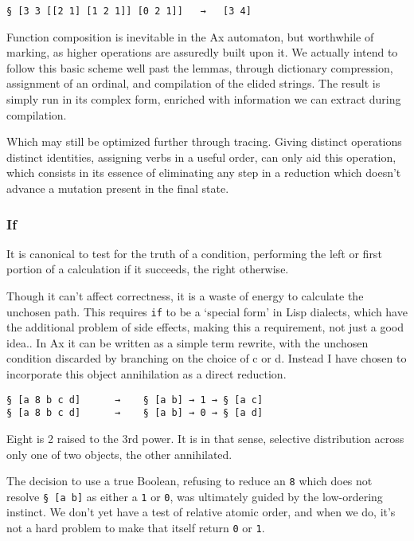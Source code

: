 \documentclass[twoside]{article}
\begin{document}
\begin{lstlisting}[style=listingblock]
§ [3 3 [[2 1] [1 2 1]] [0 2 1]]   →   [3 4]
\end{lstlisting}


Function composition is inevitable in the Ax automaton, but worthwhile of marking, as higher operations are assuredly built upon it. We actually intend to follow this basic scheme well past the lemmas, through dictionary compression, assignment of an ordinal, and compilation of the elided strings. The result is simply run in its complex form, enriched with information we can extract during compilation.

Which may still be optimized further through tracing. Giving distinct operations distinct identities, assigning verbs in a useful order, can only aid this operation, which consists in its essence of eliminating any step in a reduction which doesn't advance a mutation present in the final state.

\subsubsection{If}

It is canonical to test for the truth of a condition, performing the left or first portion of a calculation if it succeeds, the right otherwise.

Though it can't affect correctness, it is a waste of energy to calculate the unchosen path. This requires \texttt{if} to be a `special form' in Lisp dialects, which have the additional problem of side effects, making this a requirement, not just a good idea.. In Ax it can be written as a simple term rewrite, with the unchosen condition discarded by branching on the choice of c or d.  Instead I have chosen to incorporate this object annihilation as a direct reduction.

\begin{lstlisting}[style=listingcode]
§ [a 8 b c d]      →    § [a b] → 1 → § [a c]
§ [a 8 b c d]      →    § [a b] → 0 → § [a d]
\end{lstlisting}

Eight is 2 raised to the 3rd power. It is in that sense, selective distribution across only one of two objects, the other annihilated.

The decision to use a true Boolean, refusing to reduce an \texttt{8} which does not resolve \texttt{§ [a b]} as either a \texttt{1} or \texttt{0}, was ultimately guided by the low-ordering instinct. We don't yet have a test of relative atomic order, and when we do, it's not a hard problem to make that itself return \texttt{0} or \texttt{1}.
\end{document}

